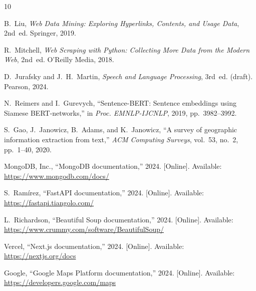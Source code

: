 \documentclass[conference]{IEEEtran}
\begin{document}
\begin{thebibliography}{10}

B.~Liu, \emph{Web Data Mining: Exploring Hyperlinks, Contents, and Usage Data}, 2nd~ed. Springer, 2019.

R.~Mitchell, \emph{Web Scraping with Python: Collecting More Data from the Modern Web}, 2nd~ed. O'Reilly Media, 2018.

D.~Jurafsky and J.~H.~Martin, \emph{Speech and Language Processing}, 3rd~ed. (draft). Pearson, 2024.

N.~Reimers and I.~Gurevych, ``Sentence-BERT: Sentence embeddings using Siamese BERT-networks,'' in \emph{Proc. EMNLP-IJCNLP}, 2019, pp.~3982--3992.

S.~Gao, J.~Janowicz, B.~Adams, and K.~Janowicz, ``A survey of geographic information extraction from text,'' \emph{ACM Computing Surveys}, vol.~53, no.~2, pp.~1--40, 2020.

MongoDB, Inc., ``MongoDB documentation,'' 2024. [Online]. Available: \url{https://www.mongodb.com/docs/}

S.~Ramírez, ``FastAPI documentation,'' 2024. [Online]. Available: \url{https://fastapi.tiangolo.com/}

L.~Richardson, ``Beautiful Soup documentation,'' 2024. [Online]. Available: \url{https://www.crummy.com/software/BeautifulSoup/}

Vercel, ``Next.js documentation,'' 2024. [Online]. Available: \url{https://nextjs.org/docs}

Google, ``Google Maps Platform documentation,'' 2024. [Online]. Available: \url{https://developers.google.com/maps}

\end{thebibliography}
\end{document}
